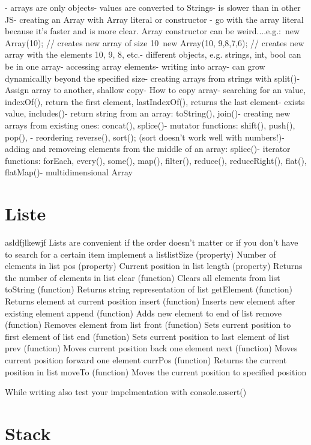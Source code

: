 \documentclass{book}
\begin{document}
- arrays are only objects- values are converted to Strings- is slower than in other JS- creating an Array with Array literal or constructor - go with the array literal because it's faster and is more clear. Array constructor can be weird....e.g.: new Array(10); // creates new array of size 10 new Array(10, 9,8,7,6); // creates new array with the elements 10, 9, 8, etc.- different objects, e.g. strings, int, bool can be in one array- accessing array elements- writing into array- can grow dynamicallly beyond the specified size- creating arrays from strings with split()- Assign array to another, shallow copy- How to copy array- searching for an value, indexOf(), return the first element, lastIndexOf(), returns the last element- exists value, includes()- return string from an array: toString(), join()- creating new arrays from existing ones: concat(), splice()- mutator functions: shift(), push(), pop(), - reordering reverse(), sort(); (sort doesn't work well with numbers!)- adding and removeing elements from the middle of an array: splice()- iterator functions: forEach, every(), some(), map(), filter(), reduce(), reduceRight(), flat(), flatMap()- multidimensional Array

\section{Liste}
asldfjlkewjf
Lists are convenient if the order doesn't matter or if you don't have to search for a certain item
implement a listlistSize (property) Number of elements in list
pos (property) Current position in list
length (property) Returns the number of elements in list
clear (function) Clears all elements from list
toString (function) Returns string representation of list
getElement (function) Returns element at current position
insert (function) Inserts new element after existing element
append (function) Adds new element to end of list
remove (function) Removes element from list
front (function) Sets current position to first element of list
end (function) Sets current position to last element of list
prev (function) Moves current position back one element
next (function) Moves current position forward one element
currPos (function) Returns the current position in list
moveTo (function) Moves the current position to specified position

While writing also test your impelmentation with console.assert()
\section{Stack}
\end{document}
